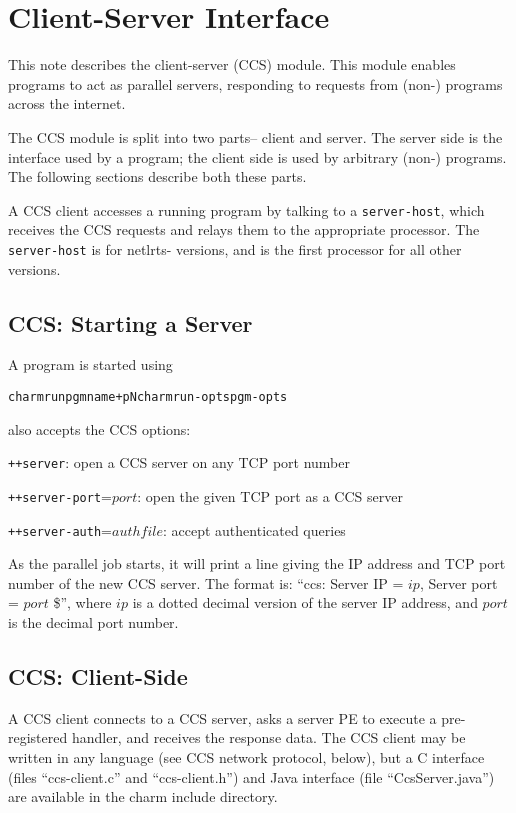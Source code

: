 \chapter{\converse{} Client-Server Interface}

This note describes the \converse{} client-server (CCS) 
module. This module enables \converse{} programs to act as
parallel servers, responding to requests from (non-\converse{}) programs
across the internet.

The CCS module is split into two parts-- client and server. 
The server side is the interface used by a \converse{} program;
the client side is used by arbitrary (non-\converse{}) programs.
The following sections describe both these parts. 

A CCS client accesses a running \converse{} program by talking to
a {\tt server-host}, which receives the CCS requests and relays them
to the appropriate processor.  The {\tt server-host} is 
for netlrts- versions, and is the first processor for all other versions.


\section{CCS: Starting a Server}
A \converse{} program is started using
\begin{alltt}
charmrun pgmname +pN charmrun-opts pgm-opts
\end{alltt}
 also accepts the CCS options:

{\tt ++server}: open a CCS server on any TCP port number

{\tt ++server-port}=$port$: open the given TCP port as a CCS server   

{\tt ++server-auth}=$authfile$: accept authenticated queries

As the parallel job starts, it will print a line giving the 
IP address and TCP port number of the new CCS server.
The format is: ``ccs: Server IP = $ip$, Server port = $port$ \$'',
where $ip$ is a dotted decimal version of the 
server IP address, and $port$ is the decimal port number.

\section{CCS: Client-Side}

A CCS client connects to a CCS server, asks a server PE to 
execute a pre-registered handler, and receives the response data.
The CCS client may be written in any language (see CCS network protocol,
below), but a C interface (files ``ccs-client.c'' and ``ccs-client.h'') 
and Java interface (file ``CcsServer.java'') are available in 
the charm include directory.

